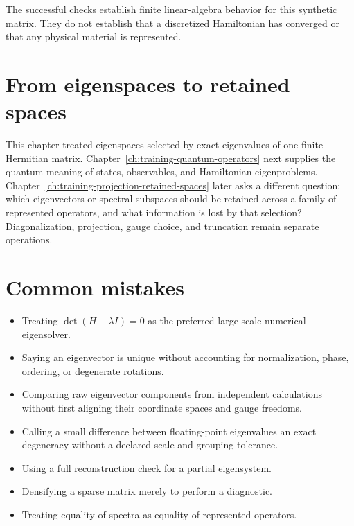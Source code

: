 The successful checks establish finite linear-algebra behavior for this
synthetic matrix. They do not establish that a discretized Hamiltonian has
converged or that any physical material is represented.


\section{From eigenspaces to retained spaces}

This chapter treated eigenspaces selected by exact eigenvalues of one finite
Hermitian matrix. Chapter~\ref{ch:training-quantum-operators} next supplies the
quantum meaning of states, observables, and Hamiltonian eigenproblems.
Chapter~\ref{ch:training-projection-retained-spaces} later asks a different
question: which eigenvectors or spectral subspaces should be retained across a
family of represented operators, and what information is lost by that
selection? Diagonalization, projection, gauge choice, and truncation remain
separate operations.

\section{Common mistakes}

\begin{itemize}
  \item Treating \(\det(H-\lambda I)=0\) as the preferred large-scale
        numerical eigensolver.
  \item Saying an eigenvector is unique without accounting for normalization,
        phase, ordering, or degenerate rotations.
  \item Comparing raw eigenvector components from independent calculations
        without first aligning their coordinate spaces and gauge freedoms.
  \item Calling a small difference between floating-point eigenvalues an exact
        degeneracy without a declared scale and grouping tolerance.
  \item Using a full reconstruction check for a partial eigensystem.
  \item Densifying a sparse matrix merely to perform a diagnostic.
  \item Treating equality of spectra as equality of represented operators.
\end{itemize}

